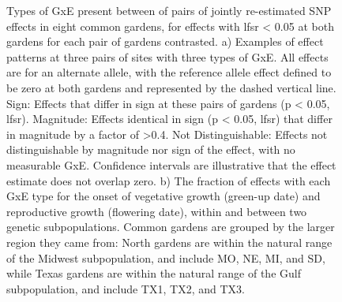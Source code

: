 \documentclass[
  9pt,
  twocolumn,
  twoside]{pnas-new}
\begin{document}
\begin{figure}


\caption{\label{fig-effects}Types of GxE present between of pairs of
jointly re-estimated SNP effects in eight common gardens, for effects
with lfsr \textless{} 0.05 at both gardens for each pair of gardens
contrasted. a) Examples of effect patterns at three pairs of sites with
three types of GxE. All effects are for an alternate allele, with the
reference allele effect defined to be zero at both gardens and
represented by the dashed vertical line. Sign: Effects that differ in
sign at these pairs of gardens (p \textless{} 0.05, lfsr). Magnitude:
Effects identical in sign (p \textless{} 0.05, lfsr) that differ in
magnitude by a factor of \textgreater0.4. Not Distinguishable: Effects
not distinguishable by magnitude nor sign of the effect, with no
measurable GxE. Confidence intervals are illustrative that the effect
estimate does not overlap zero. b) The fraction of effects with each GxE
type for the onset of vegetative growth (green-up date) and reproductive
growth (flowering date), within and between two genetic subpopulations.
Common gardens are grouped by the larger region they came from: North
gardens are within the natural range of the Midwest subpopulation, and
include MO, NE, MI, and SD, while Texas gardens are within the natural
range of the Gulf subpopulation, and include TX1, TX2, and TX3.}

\end{figure}%
\end{document}
